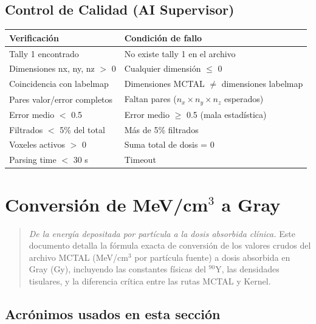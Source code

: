 \documentclass[12pt,a4paper]{article}
\begin{document}
\subsection*{Control de Calidad (AI Supervisor)}

\begin{tabular}{p{5cm} p{10cm}}
\toprule
\textbf{Verificación} & \textbf{Condición de fallo} \\
\midrule
Tally 1 encontrado & No existe tally 1 en el archivo \\
Dimensiones nx, ny, nz $>$ 0 & Cualquier dimensión $\leq$ 0 \\
Coincidencia con labelmap & Dimensiones MCTAL $\neq$ dimensiones labelmap \\
Pares valor/error completos & Faltan pares ($n_x \times n_y \times n_z$ esperados) \\
Error medio $<$ 0.5 & Error medio $\geq$ 0.5 (mala estadística) \\
Filtrados $<$ 5\% del total & Más de 5\% filtrados \\
Voxeles activos $>$ 0 & Suma total de dosis = 0 \\
Parsing time $<$ 30 s & Timeout \\
\bottomrule
\end{tabular}

\newpage

\section{Conversión de MeV/cm$^3$ a Gray}

\begin{quote}
\textit{De la energía depositada por partícula a la dosis absorbida clínica.} Este documento detalla la fórmula exacta de conversión de los valores crudos del archivo MCTAL (MeV/cm$^3$ por partícula fuente) a dosis absorbida en Gray (Gy), incluyendo las constantes físicas del $^{90}$Y, las densidades tisulares, y la diferencia crítica entre las rutas MCTAL y Kernel.
\end{quote}

\subsection*{Acrónimos usados en esta sección}
\end{document}

